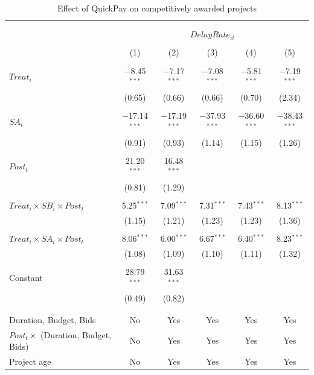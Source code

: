 \documentclass[]{article}
\begin{document}
\begin{table}[H] \centering 
  \caption{Effect of QuickPay on competitively awarded projects} 
  \label{} 
\small 
\begin{tabular}{@{\extracolsep{-2pt}}lccccc} 
\\[-1.8ex]\hline 
\hline \\[-1.8ex] 
\\[-1.8ex] & \multicolumn{5}{c}{$DelayRate_{it}$  } \\ 
\\[-1.8ex] & (1) & (2) & (3) & (4) & (5)\\ 
\hline \\[-1.8ex] 
 $Treat_i$ & $-$8.45$^{***}$ & $-$7.17$^{***}$ & $-$7.08$^{***}$ & $-$5.81$^{***}$ & $-$7.19$^{***}$ \\ 
  & (0.65) & (0.66) & (0.66) & (0.70) & (2.34) \\ 
  & & & & & \\ 
 $SA_i$ & $-$17.14$^{***}$ & $-$17.19$^{***}$ & $-$37.93$^{***}$ & $-$36.60$^{***}$ & $-$38.43$^{***}$ \\ 
  & (0.91) & (0.93) & (1.14) & (1.15) & (1.26) \\ 
  & & & & & \\ 
 $Post_t$ & 21.20$^{***}$ & 16.48$^{***}$ &  &  &  \\ 
  & (0.81) & (1.29) &  &  &  \\ 
  & & & & & \\ 
 $Treat_i \times SB_i \times Post_t$ & 5.25$^{***}$ & 7.09$^{***}$ & 7.31$^{***}$ & 7.43$^{***}$ & 8.13$^{***}$ \\ 
  & (1.15) & (1.21) & (1.23) & (1.23) & (1.36) \\ 
  & & & & & \\ 
 $Treat_i \times SA_i \times Post_t$ & 8.06$^{***}$ & 6.00$^{***}$ & 6.67$^{***}$ & 6.40$^{***}$ & 8.23$^{***}$ \\ 
  & (1.08) & (1.09) & (1.10) & (1.11) & (1.32) \\ 
  & & & & & \\ 
 Constant & 28.79$^{***}$ & 31.63$^{***}$ &  &  &  \\ 
  & (0.49) & (0.82) &  &  &  \\ 
  & & & & & \\ 
\hline \\[-1.8ex] 
Duration, Budget, Bids & No & Yes & Yes & Yes & Yes \\ 
$Post_t \times $  (Duration, Budget, Bids) & No & Yes & Yes & Yes & Yes \\ 
Project age & No & Yes & Yes & Yes & Yes \\ 

\end{tabular}
\end{table}
\end{document}
